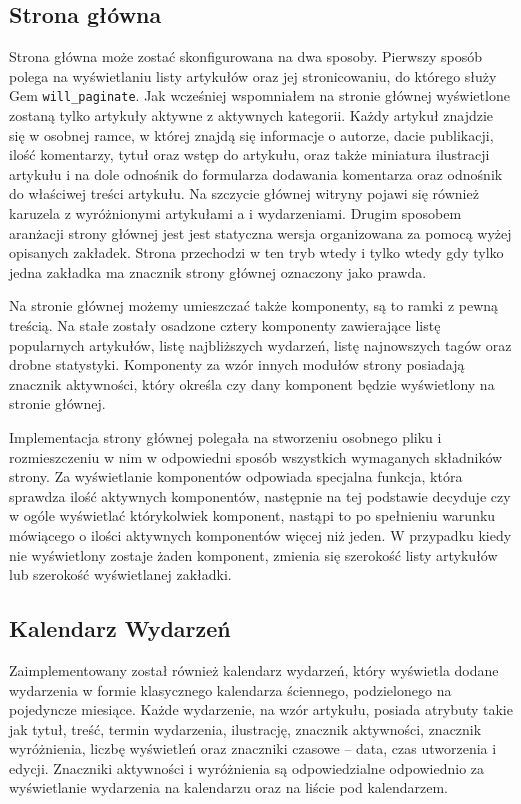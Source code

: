 \documentclass[openright]{xmgr}
\begin{document}
\newpage

\subsection{Strona główna}
Strona główna może zostać skonfigurowana na dwa sposoby. Pierwszy sposób polega na wyświetlaniu listy artykułów oraz jej stronicowaniu, do którego służy Gem \texttt{will\_paginate}\cite{willpaginate}. Jak wcześniej wspomniałem na stronie głównej wyświetlone zostaną tylko artykuły aktywne z aktywnych kategorii. Każdy artykuł znajdzie się w osobnej ramce, w której znajdą się informacje o autorze, dacie publikacji, ilość komentarzy, tytuł oraz wstęp do artykułu, oraz także miniatura ilustracji artykułu i na dole odnośnik do formularza dodawania komentarza oraz odnośnik do właściwej treści artykułu. Na szczycie głównej witryny pojawi się również karuzela z wyróżnionymi artykułami a i wydarzeniami. Drugim sposobem aranżacji strony głównej jest jest statyczna wersja organizowana za pomocą wyżej opisanych zakładek. Strona przechodzi w ten tryb wtedy i tylko wtedy gdy tylko jedna zakładka ma znacznik strony głównej oznaczony jako prawda.

Na stronie głównej możemy umieszczać także komponenty, są to ramki z pewną treścią. Na stałe zostały osadzone cztery komponenty zawierające listę popularnych artykułów, listę najbliższych wydarzeń, listę najnowszych tagów oraz drobne statystyki. Komponenty za wzór innych modułów strony posiadają znacznik aktywności, który określa czy dany komponent będzie wyświetlony na stronie głównej.

Implementacja strony głównej polegała na stworzeniu osobnego pliku i rozmieszczeniu w nim w odpowiedni sposób wszystkich wymaganych składników strony. Za wyświetlanie komponentów odpowiada specjalna funkcja, która sprawdza ilość aktywnych komponentów, następnie na tej podstawie decyduje czy w ogóle wyświetlać którykolwiek komponent, nastąpi to po spełnieniu warunku mówiącego o ilości aktywnych komponentów więcej niż jeden. W przypadku kiedy nie wyświetlony zostaje żaden komponent, zmienia się szerokość listy artykułów lub szerokość wyświetlanej zakładki.

\newpage

\subsection{Kalendarz Wydarzeń}
Zaimplementowany został również kalendarz wydarzeń, który wyświetla dodane wydarzenia w formie klasycznego kalendarza ściennego, podzielonego na pojedyncze miesiące. Każde wydarzenie, na wzór artykułu, posiada atrybuty takie jak tytuł, treść, termin wydarzenia, ilustrację, znacznik aktywności, znacznik wyróżnienia, liczbę wyświetleń oraz znaczniki czasowe – data, czas utworzenia i edycji. Znaczniki aktywności i wyróżnienia są odpowiedzialne odpowiednio za wyświetlanie wydarzenia na kalendarzu oraz na liście pod kalendarzem.
\end{document}
